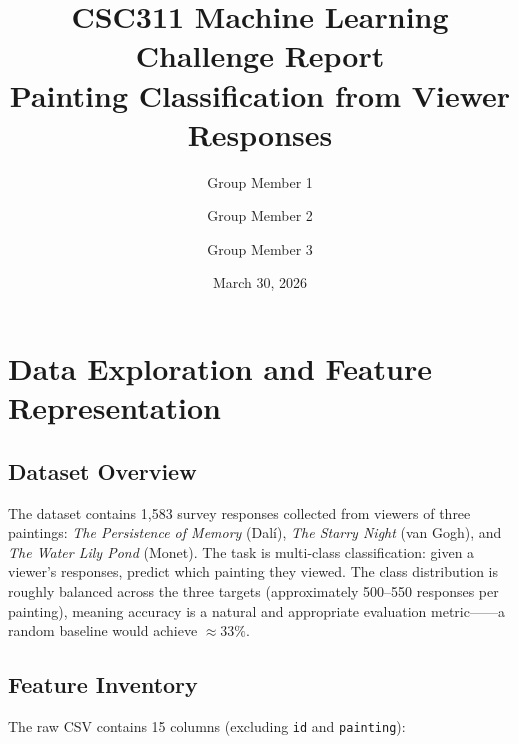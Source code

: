 \documentclass[11pt,letterpaper]{article}
\title{\textbf{CSC311 Machine Learning Challenge Report}\\[0.4em]
       \large Painting Classification from Viewer Responses}
\author{%
  Group Member 1 \and Group Member 2 \and Group Member 3
}
\date{March 30, 2026}
\begin{document}
\maketitle
\tableofcontents
\newpage

\section{Data Exploration and Feature Representation}

\subsection{Dataset Overview}

The dataset contains 1{,}583 survey responses collected from viewers of three paintings:
\emph{The Persistence of Memory} (Dalí), \emph{The Starry Night} (van Gogh), and
\emph{The Water Lily Pond} (Monet). The task is multi-class classification: given a
viewer's responses, predict which painting they viewed. The class distribution is
roughly balanced across the three targets (approximately 500--550 responses per
painting), meaning accuracy is a natural and appropriate evaluation metric——a
random baseline would achieve $\approx 33\%$.

\subsection{Feature Inventory}

The raw CSV contains 15 columns (excluding \texttt{id} and \texttt{painting}):
\end{document}
